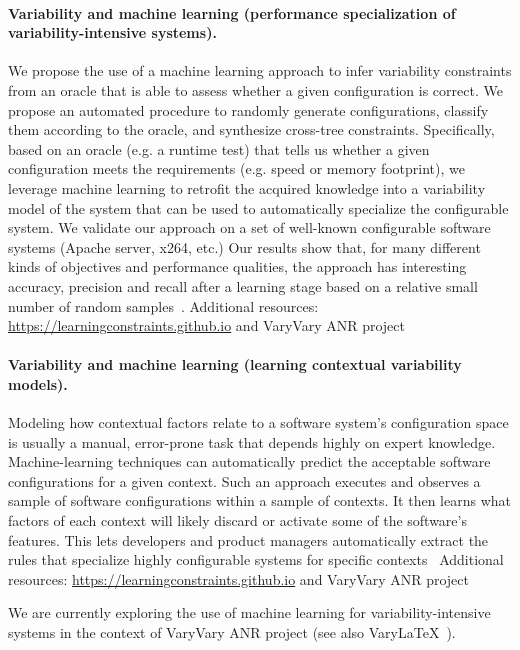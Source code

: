 \paragraph{Variability and machine learning (performance specialization of variability-intensive systems).}
	We propose the use of a machine learning approach to infer variability constraints
	from an oracle that is able to assess whether a given configuration is correct.
	We propose an automated procedure to randomly generate configurations, classify them according to the oracle, and synthesize cross-tree constraints. Specifically, based on an oracle (e.g. a runtime test) that tells us whether a given configuration meets the requirements (e.g. speed or memory footprint), we leverage machine learning to retrofit the acquired knowledge into a variability model of the system that can be used to automatically specialize the configurable system. We validate our approach on a set of well-known configurable software systems (Apache server, x264, etc.) 
    Our results show that, for many different kinds of objectives and performance qualities, the approach has interesting accuracy, precision and recall after a learning stage based on a relative small number of random samples~\cite{temple:hal-01467299}.    
    Additional resources: \url{https://learningconstraints.github.io} and VaryVary ANR project
    
\paragraph{Variability and machine learning (learning contextual variability models).} 
Modeling how contextual factors relate to a software system’s configuration space is usually a manual, error-prone task that depends highly on expert knowledge. Machine-learning techniques can automatically predict the acceptable software configurations for a given context. Such an approach executes and observes a sample of software configurations within a sample of contexts. It then learns what factors of each context will likely discard or activate some of the software’s features. This lets developers and product managers automatically extract the rules that specialize highly configurable systems for specific contexts~\cite{temple:hal-01659137}
Additional resources: \url{https://learningconstraints.github.io} and VaryVary ANR project

We are currently exploring the use of machine learning for variability-intensive systems in the context of VaryVary ANR project (see also VaryLaTeX~\cite{acher:hal-01659161}).










